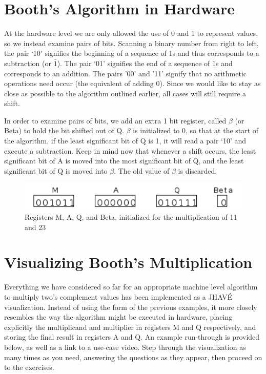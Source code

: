 \documentclass{article}
\begin{document}
\section{Booth's Algorithm in Hardware}
    At the hardware level we are only allowed the use of 0 and 1 to represent values, so we instead examine pairs of bits.
Scanning a binary number from right to left, the pair `10' signifies the beginning of a sequence of 1s and thus corresponds to a subtraction (or $\bar{1}$).
The pair `01' signifies the end of a sequence of 1s and corresponds to an addition.
The pairs '00' and '11' signify that no arithmetic operations need occur (the equivalent of adding 0).
Since we would like to stay as close as possible to the algorithm outlined earlier, all cases will still require a shift.

    In order to examine pairs of bits, we add an extra 1 bit register, called $\beta$ (or Beta) to hold the bit shifted out of Q.
$\beta$ is initialized to 0, so that at the start of the algorithm, if the least significant bit of Q is 1, it will read a pair `10' and execute a subtraction.
Keep in mind now that whenever a shift occurs, the least significant bit of A is moved into the most significant bit of Q, and the least significant bit of Q is moved into $\beta$.
The old value of $\beta$ is discarded.

\begin{figure}[h]
\centering
\includegraphics{init2.pdf}
\caption{Registers M, A, Q, and Beta, initialized for the multiplication of 11 and 23}
\end{figure}

\section{Visualizing Booth's Multiplication}
Everything we have considered so far for an appropriate machine level algorithm to multiply two's complement values has been implemented as a JHAVÉ visualization.
Instead of using the form of the previous examples, it more closely resembles the way the algorithm might be executed in hardware, placing explicitly the multiplicand and multiplier in registers M and Q respectively, and storing the final result in registers A and Q.
An example run-through is provided below, as well as a link to a use-case video.
Step through the visualization as many times as you need, answering the questions as they appear, then proceed on to the exercises.
\end{document}
